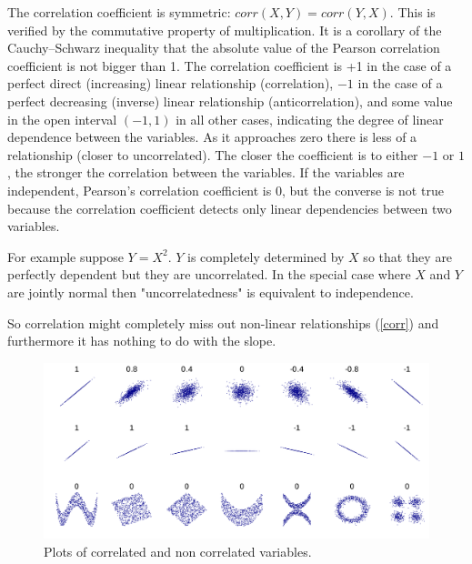 The correlation coefficient is symmetric: $corr(X,Y)=corr (Y,X)$. This is verified by the commutative property of multiplication.
It is a corollary of the Cauchy–Schwarz inequality that the absolute value of the Pearson correlation coefficient is not bigger than 1. The correlation coefficient is +1 in the case of a perfect direct (increasing) linear relationship (correlation), $-1$ in the case of a perfect decreasing (inverse) linear relationship (anticorrelation), and some value in the open interval 
$(-1,1)$ in all other cases, indicating the degree of linear dependence between the variables. As it approaches zero there is less of a relationship (closer to uncorrelated). The closer the coefficient is to either $-1$ or $1$, the stronger the correlation between the variables.
If the variables are independent, Pearson's correlation coefficient is $0$, but the converse is not true because the correlation coefficient detects only linear dependencies between two variables.

For example suppose $Y=X^2$. $Y$ is completely determined by $X$ so that they are perfectly dependent but they are uncorrelated.
In the special case where $X$ and $Y$ are jointly normal then "uncorrelatedness" is equivalent to independence.

So correlation might completely miss out non-linear relationships (\autoref{corr}) and furthermore it has nothing to do with the slope.
\begin{figure}
\centering
\includegraphics[scale=0.137]{img/corr}
\caption{Plots of correlated and non correlated variables.}
\label{corr}
\end{figure}
